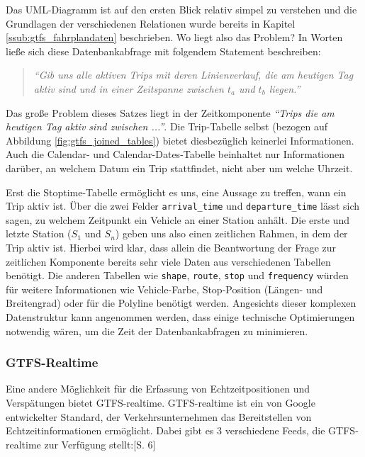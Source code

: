         Das UML-Diagramm ist auf den ersten Blick relativ simpel zu verstehen und die Grundlagen der verschiedenen Relationen wurde bereits in Kapitel \ref{ssub:gtfs_fahrplandaten} beschrieben. Wo liegt also das Problem? In Worten ließe sich diese Datenbankabfrage mit folgendem Statement beschreiben: 

        \begin{quote}
          \label{query_statement}
          \textit{"`Gib uns alle aktiven Trips mit deren Linienverlauf, die am heutigen Tag aktiv sind und in einer Zeitspanne zwischen $t_a$ und $t_b$ liegen."'}
        \end{quote}

        Das große Problem dieses Satzes liegt in der Zeitkomponente \textit{"`Trips die am heutigen Tag aktiv sind zwischen ..."'}. Die Trip-Tabelle selbst (bezogen auf Abbildung \ref{fig:gtfs_joined_tables}) bietet diesbezüglich keinerlei Informationen. Auch die Calendar- und Calendar-Dates-Tabelle beinhaltet nur Informationen darüber, an welchem Datum ein Trip stattfindet, nicht aber um welche Uhrzeit. 

        Erst die Stoptime-Tabelle ermöglicht es uns, eine Aussage zu treffen, wann ein Trip aktiv ist. Über die zwei Felder \texttt{arrival\_time} und \texttt{departure\_time} lässt sich sagen, zu welchem Zeitpunkt ein Vehicle an einer Station anhält. Die erste und letzte Station ($S_1$ und $S_n$) geben uns also einen zeitlichen Rahmen, in dem der Trip aktiv ist.
        Hierbei wird klar, dass allein die Beantwortung der Frage zur zeitlichen Komponente bereits sehr viele Daten aus verschiedenen Tabellen benötigt. Die anderen Tabellen wie \texttt{shape}, \texttt{route}, \texttt{stop} und \texttt{frequency} würden für weitere Informationen wie Vehicle-Farbe, Stop-Position (Längen- und Breitengrad) oder für die Polyline benötigt werden. Angesichts dieser komplexen Datenstruktur kann angenommen werden, dass einige technische Optimierungen notwendig wären, um die Zeit der Datenbankabfragen zu minimieren. 
    
    \subsubsection{GTFS-Realtime}
    \label{ssub:gtfs_realtime}
      Eine andere Möglichkeit für die Erfassung von Echtzeitpositionen und Verspätungen bietet GTFS-realtime. GTFS-realtime ist ein von Google entwickelter Standard, der Verkehrsunternehmen das Bereitstellen von Echtzeitinformationen ermöglicht. Dabei gibt es 3 verschiedene Feeds, die GTFS-realtime zur Verfügung stellt:\parencite{zervaas_realtime}[S. 6]

